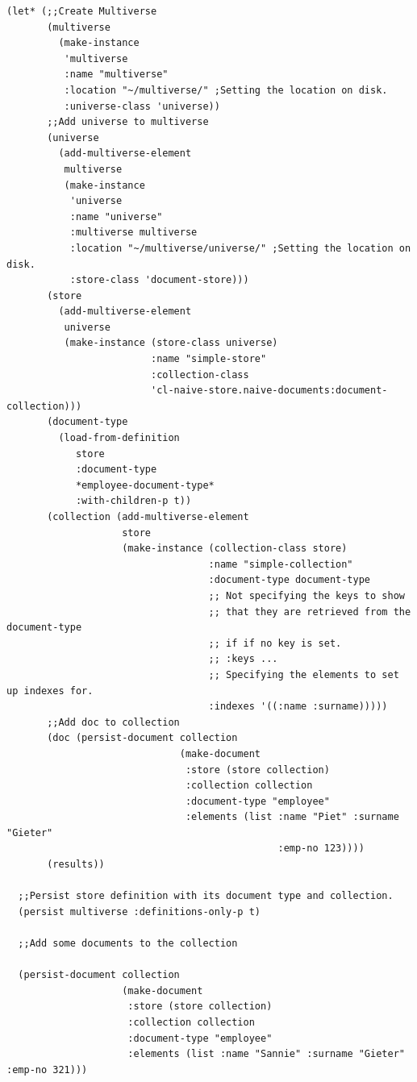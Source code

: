 \documentclass[11pt]{article}
\begin{document}
\begin{verbatim}
(let* (;;Create Multiverse
       (multiverse
         (make-instance
          'multiverse
          :name "multiverse"
          :location "~/multiverse/" ;Setting the location on disk.
          :universe-class 'universe))
       ;;Add universe to multiverse
       (universe
         (add-multiverse-element
          multiverse
          (make-instance
           'universe
           :name "universe"
           :multiverse multiverse
           :location "~/multiverse/universe/" ;Setting the location on disk.
           :store-class 'document-store)))
       (store
         (add-multiverse-element
          universe
          (make-instance (store-class universe)
                         :name "simple-store"
                         :collection-class
                         'cl-naive-store.naive-documents:document-collection)))
       (document-type
         (load-from-definition
            store
            :document-type
            *employee-document-type*
            :with-children-p t))
       (collection (add-multiverse-element
                    store
                    (make-instance (collection-class store)
                                   :name "simple-collection"
                                   :document-type document-type
                                   ;; Not specifying the keys to show
                                   ;; that they are retrieved from the document-type
                                   ;; if if no key is set.
                                   ;; :keys ...
                                   ;; Specifying the elements to set up indexes for.
                                   :indexes '((:name :surname)))))
       ;;Add doc to collection
       (doc (persist-document collection
                              (make-document
                               :store (store collection)
                               :collection collection
                               :document-type "employee"
                               :elements (list :name "Piet" :surname "Gieter"
                                               :emp-no 123))))
       (results))

  ;;Persist store definition with its document type and collection.
  (persist multiverse :definitions-only-p t)

  ;;Add some documents to the collection

  (persist-document collection
                    (make-document
                     :store (store collection)
                     :collection collection
                     :document-type "employee"
                     :elements (list :name "Sannie" :surname "Gieter" :emp-no 321)))


\end{verbatim}
\end{document}
